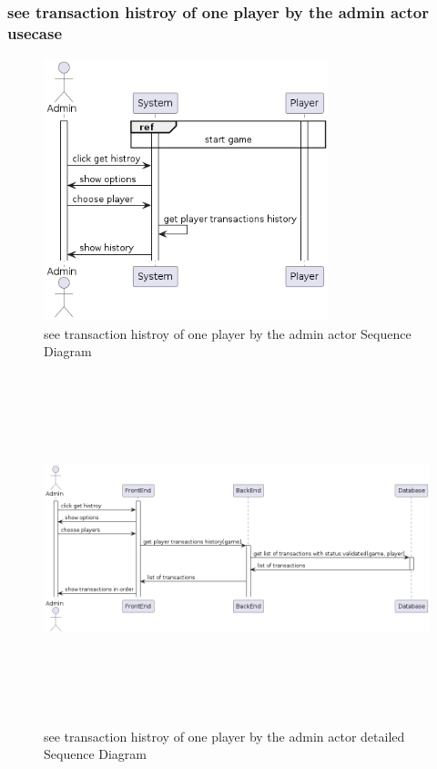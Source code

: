 \documentclass{article}
\begin{document}
\subsubsection{see transaction histroy of one player by the admin actor usecase}
\begin{figure}[H]
	\centering
	\includegraphics[height=3in]{../thesis_tex/assets/diagrams/see_transaction_history_of_one_player_SD.png}
	\caption{see transaction histroy of one player by the admin actor Sequence Diagram}
\end{figure}

\begin{figure}[H]
	\centering
	\includegraphics[height=4in,width=6in]{../thesis_tex/assets/diagrams/see_transaction_history_of_one_player_detailedSD.png}
	\caption{see transaction histroy of one player by the admin actor detailed Sequence Diagram}
\end{figure}
\end{document}
